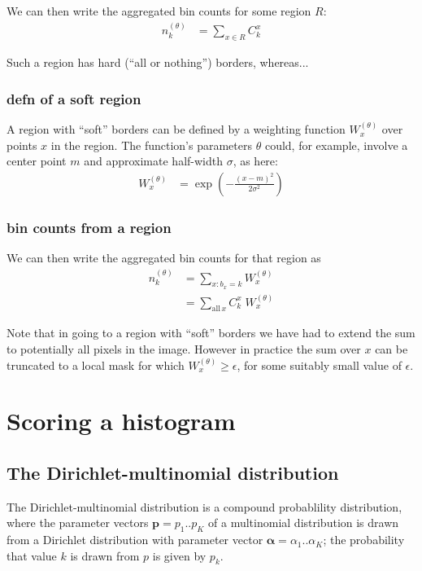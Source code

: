 \documentclass{report}
\begin{document}
We can then write the aggregated bin counts for some region $R$:
\begin{align}
n_k^{(\theta)} &= \sum_{x \in R} C^x_k
\end{align}

Such a region has hard (``all or nothing'') borders, whereas...


\subsubsection{defn of a soft region}
A region with ``soft'' borders can be defined by a weighting function $W^{(\theta)}_x$
over points $x$ in the region. The function's parameters $\theta$
could, for example, involve a center point $m$ and approximate half-width $\sigma$, as here:
\begin{align}
W^{(\theta)}_x 
&= \exp\left( -\frac{(x-m)^2}{2\sigma^2} \right) \label{eq:region-weight-in-1d} 
\end{align}

\subsubsection{bin counts from a region}
We can then write the aggregated bin counts for that region as
\begin{align}
n_k^{(\theta)} 
&= \sum_{x : b_{x}=k} W^{(\theta)}_x \\
&= \sum_{\text{all} \, x} C^x_k  \; W^{(\theta)}_x   \label{eq:soft-bin-counts} 
\end{align}

Note that in going to a region with ``soft'' borders we have had to
extend the sum to potentially all pixels in the image. However in
practice the sum over $x$ can be truncated to a local mask for which
$W^{(\theta)}_x \geq \epsilon$, for some suitably small value of
$\epsilon$.


\section{Scoring a histogram}



\subsection{The Dirichlet-multinomial distribution}

The Dirichlet-multinomial distribution is a compound probablility
distribution, where the parameter vectors $\textbf{p} = p_1 .. p_K$ of
a multinomial distribution is drawn from a Dirichlet distribution with
parameter vector $\boldsymbol\alpha = \alpha_1 .. \alpha_K$; the
probability that value $k$ is drawn from $p$ is given by $p_k$.
\end{document}
